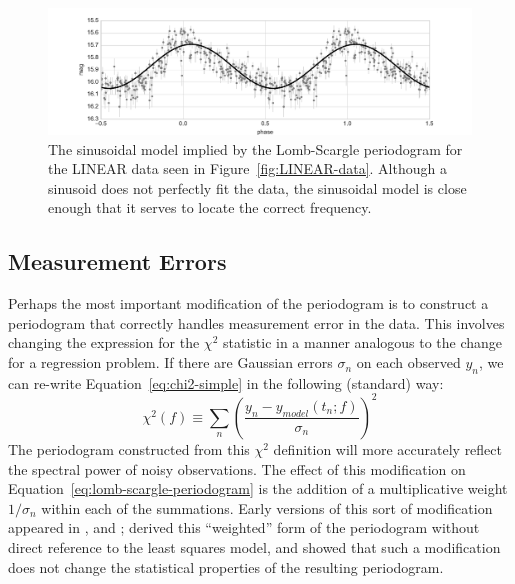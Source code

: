 \documentclass[preprint]{aastex}
\newcommand{\fig}[1]{Figure~\ref{fig:#1}}
\newcommand{\figlabel}[1]{\label{fig:#1}}
\newcommand{\Eq}[1]{Equation~\ref{eq:#1}}
\newcommand{\eq}[1]{\Eq{#1}}
\newcommand{\eqlabel}[1]{\label{eq:#1}}
\newcommand{\sectlabel}[1]{\label{sect:#1}}
\begin{document}
\begin{figure}[ht]
  \centering
  \includegraphics[width=\textwidth]{fig18_ls_model}
  \caption{The sinusoidal model implied by the Lomb-Scargle periodogram for
    the LINEAR data seen in \fig{LINEAR-data}.
    Although a sinusoid does not perfectly fit the data, the sinusoidal model
    is close enough that it serves to locate the correct frequency.
    \figlabel{ls-model}}
\end{figure}


\subsection{Measurement Errors}
\sectlabel{extensions-observational-noise}
Perhaps the most important modification of the periodogram is to
construct a periodogram that correctly handles measurement error in the data.
This involves changing the expression for the $\chi^2$ statistic in a manner
analogous to the change for a regression problem.
If there are Gaussian errors $\sigma_n$ on each observed $y_n$, we can re-write \eq{chi2-simple} in the following (standard) way:
\begin{equation}
  \chi^2(f) \equiv \sum_n \left(\frac{y_n - y_{model}(t_n;f)}{\sigma_n}\right)^2
  \eqlabel{chi2-with-errors}
\end{equation}
The periodogram constructed from this $\chi^2$ definition will more accurately
reflect the spectral power of noisy observations.
The effect of this modification on \eq{lomb-scargle-periodogram} is the addition
of a multiplicative weight $1/\sigma_n$ within each of the summations.
Early versions of this sort of modification appeared in \citet{Gilliland87}, and
\citet{Irwin89}; \citet{Scargle89} derived this ``weighted'' form of the
periodogram without direct reference to the least squares model,
and \citet{Zechmeister09} showed that such a modification does not change
the statistical properties of the resulting periodogram.
\end{document}
